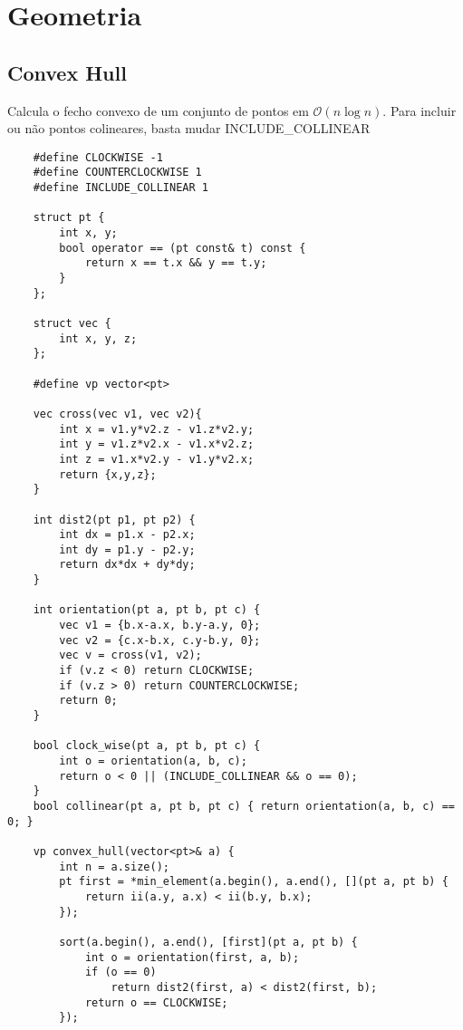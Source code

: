\section{Geometria}

\subsection{Convex Hull}

Calcula o fecho convexo de um conjunto de pontos em $\mathcal{O} (n\log n)$.
Para incluir ou não pontos colineares, basta mudar INCLUDE\_COLLINEAR

\begin{verbatim}
    #define CLOCKWISE -1
    #define COUNTERCLOCKWISE 1
    #define INCLUDE_COLLINEAR 1
    
    struct pt {
        int x, y;
        bool operator == (pt const& t) const {
            return x == t.x && y == t.y;
        }
    };
    
    struct vec {
        int x, y, z;
    };
    
    #define vp vector<pt>
    
    vec cross(vec v1, vec v2){
        int x = v1.y*v2.z - v1.z*v2.y;
        int y = v1.z*v2.x - v1.x*v2.z;
        int z = v1.x*v2.y - v1.y*v2.x;
        return {x,y,z};
    }
    
    int dist2(pt p1, pt p2) {
        int dx = p1.x - p2.x;
        int dy = p1.y - p2.y;
        return dx*dx + dy*dy;
    }
    
    int orientation(pt a, pt b, pt c) {
        vec v1 = {b.x-a.x, b.y-a.y, 0};
        vec v2 = {c.x-b.x, c.y-b.y, 0};
        vec v = cross(v1, v2);
        if (v.z < 0) return CLOCKWISE;
        if (v.z > 0) return COUNTERCLOCKWISE;
        return 0;
    }
    
    bool clock_wise(pt a, pt b, pt c) {
        int o = orientation(a, b, c);
        return o < 0 || (INCLUDE_COLLINEAR && o == 0);
    }
    bool collinear(pt a, pt b, pt c) { return orientation(a, b, c) == 0; }
    
    vp convex_hull(vector<pt>& a) {
        int n = a.size();
        pt first = *min_element(a.begin(), a.end(), [](pt a, pt b) {
            return ii(a.y, a.x) < ii(b.y, b.x);
        });
    
        sort(a.begin(), a.end(), [first](pt a, pt b) {
            int o = orientation(first, a, b);
            if (o == 0)
                return dist2(first, a) < dist2(first, b);
            return o == CLOCKWISE;
        });
        

\end{verbatim}
